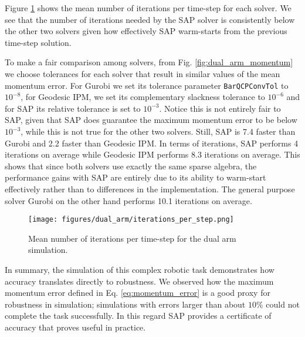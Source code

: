 Figure \ref{fig:dual_arm_iterations} shows the mean number of iterations per
time-step for each solver. We see that the number of iterations needed by the
SAP solver is consistently below the other two solvers given how effectively SAP
warm-starts from the previous time-step solution.

To make a fair comparison among solvers, from Fig. \ref{fig:dual_arm_momentum}
we choose tolerances for each solver that result in similar values of the mean
momentum error. For Gurobi we set its tolerance parameter \verb+BarQCPConvTol+
to $10^{-8}$, for Geodesic IPM, we set its complementary slackness tolerance to
$10^{-6}$ and for SAP its relative tolerance is set to $10^{-3}$. Notice this is
not entirely fair to SAP, given that SAP does guarantee the maximum momentum
error to be below $10^{-3}$, while this is not true for the other two solvers.
Still, SAP is 7.4 faster than Gurobi and 2.2 faster than Geodesic IPM. In terms
of iterations, SAP performs 4 iterations on average while Geodesic IPM performs
8.3 iterations on average. This shows that since both solvers use exactly the
same sparse algebra, the performance gains with SAP are entirely due to its
ability to warm-start effectively rather than to differences in the
implementation. The general purpose solver Gurobi on the other hand performs
10.1 iterations on average.

\begin{figure}[!h]
	\centering
    \texttt{[image: figures/dual\_arm/iterations\_per\_step.png]}
    \caption{\label{fig:dual_arm_iterations} Mean number of iterations per
    time-step for the dual arm simulation.}
\end{figure}

In summary, the simulation of this complex robotic task demonstrates how
accuracy translates directly to robustness. We observed how the maximum momentum
error defined in Eq. \eqref{eq:momentum_error} is a good proxy for robustness in
simulation; simulations with errors larger than about $10\%$ could not complete
the task successfully. In this regard SAP provides a certificate of accuracy
that proves useful in practice.
